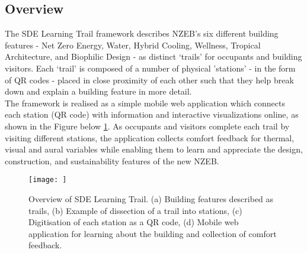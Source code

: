 

\subsection{Overview}

The SDE Learning Trail framework describes NZEB's six different building features - Net Zero Energy, Water, Hybrid Cooling, Wellness, Tropical Architecture, and Biophilic Design - as distinct ‘trails’ for occupants and building visitors. Each ‘trail’ is composed of a number of physical 'stations' - in the form of QR codes - placed in close proximity of each other such that they help break down and explain a building feature in more detail.\\

The framework is realised as a simple mobile web application which connects each station (QR code) with information and interactive visualizations online, as shown in the Figure below \ref{fig:framework}. As occupants and visitors complete each trail by visiting different stations, the application collects comfort feedback for thermal, visual and aural variables while enabling them to learn and appreciate the design, construction, and sustainability features of the new NZEB.\\

\begin{figure}
\begin{center}
\texttt{[image: ]}
\caption{Overview of SDE Learning Trail. (a) Building features described as trails, (b) Example of dissection of a trail into stations, (c) Digitisation of each station as a QR code, (d) Mobile web application for learning about the building and collection of comfort feedback.}
\label{fig:framework}
\end{center}
\end{figure}



